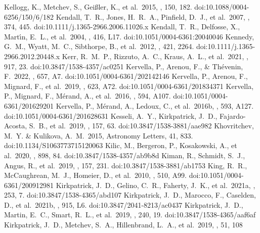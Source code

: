 \documentclass[twocolumn,tighten,twocolappendix]{aastex631}
\begin{document}
\begin{thebibliography}{}
 Kellogg, K., Metchev, S., Gei{\ss}ler, K., et al.\ 2015, \aj, 150, 182. doi:10.1088/0004-6256/150/6/182
 Kendall, T.~R., Jones, H.~R.~A., Pinfield, D.~J., et al.\ 2007, \mnras, 374, 445. doi:10.1111/j.1365-2966.2006.11026.x
 Kendall, T.~R., Delfosse, X., Mart{\'\i}n, E.~L., et al.\ 2004, \aap, 416, L17. doi:10.1051/0004-6361:20040046
 Kennedy, G.~M., Wyatt, M.~C., Sibthorpe, B., et al.\ 2012, \mnras, 421, 2264. doi:10.1111/j.1365-2966.2012.20448.x
 Kerr, R.~M.~P., Rizzuto, A.~C., Kraus, A.~L., et al.\ 2021, \apj, 917, 23. doi:10.3847/1538-4357/ac0251
 Kervella, P., Arenou, F., \& Th{\'e}venin, F.\ 2022, \aap, 657, A7. doi:10.1051/0004-6361/202142146
 Kervella, P., Arenou, F., Mignard, F., et al.\ 2019, \aap, 623, A72. doi:10.1051/0004-6361/201834371
 Kervella, P., Mignard, F., M{\'e}rand, A., et al.\ 2016, \aap, 594, A107. doi:10.1051/0004-6361/201629201
 Kervella, P., M{\'e}rand, A., Ledoux, C., et al.\ 2016b, \aap, 593, A127. doi:10.1051/0004-6361/201628631
 Kesseli, A.~Y., Kirkpatrick, J.~D., Fajardo-Acosta, S.~B., et al.\ 2019, \aj, 157, 63. doi:10.3847/1538-3881/aae982
 Khovritchev, M.~Y. \& Kulikova, A.~M.\ 2015, Astronomy Letters, 41, 833. doi:10.1134/S1063773715120063
 Kilic, M., Bergeron, P., Kosakowski, A., et al.\ 2020, \apj, 898, 84. doi:10.3847/1538-4357/ab9b8d
 Kiman, R., Schmidt, S.~J., Angus, R., et al.\ 2019, \aj, 157, 231. doi:10.3847/1538-3881/ab1753
 King, R.~R., McCaughrean, M.~J., Homeier, D., et al.\ 2010, \aap, 510, A99. doi:10.1051/0004-6361/200912981
 Kirkpatrick, J.~D., Gelino, C.~R., Faherty, J.~K., et al.\ 2021a, \apjs, 253, 7. doi:10.3847/1538-4365/abd107
 Kirkpatrick, J.~D., Marocco, F., Caselden, D., et al.\ 2021b, \apjl, 915, L6. doi:10.3847/2041-8213/ac0437
 Kirkpatrick, J.~D., Martin, E.~C., Smart, R.~L., et al.\ 2019, \apjs, 240, 19. doi:10.3847/1538-4365/aaf6af
 Kirkpatrick, J.~D., Metchev, S.~A., Hillenbrand, L.~A., et al.\ 2019, \baas, 51, 108

\end{thebibliography}
\end{document}
